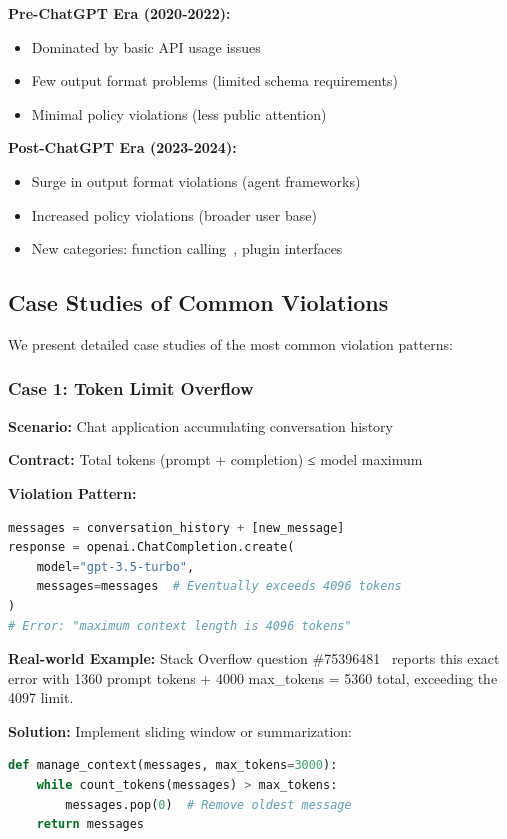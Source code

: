 \documentclass[11pt]{article}
\begin{document}
\textbf{Pre-ChatGPT Era (2020-2022):}
\begin{itemize}
    \item Dominated by basic API usage issues
    \item Few output format problems (limited schema requirements)
    \item Minimal policy violations (less public attention)
\end{itemize}

\textbf{Post-ChatGPT Era (2023-2024):}
\begin{itemize}
    \item Surge in output format violations (agent frameworks)~\cite{githublangchain22103}
    \item Increased policy violations (broader user base)~\cite{githubopenai331}
    \item New categories: function calling~\cite{githubopenai703}, plugin interfaces
\end{itemize}

\subsection{Case Studies of Common Violations}

We present detailed case studies of the most common violation patterns:

\subsubsection{Case 1: Token Limit Overflow}
\textbf{Scenario:} Chat application accumulating conversation history

\textbf{Contract:} Total tokens (prompt + completion) ≤ model maximum

\textbf{Violation Pattern:}
\begin{lstlisting}[language=Python]
messages = conversation_history + [new_message]
response = openai.ChatCompletion.create(
    model="gpt-3.5-turbo",
    messages=messages  # Eventually exceeds 4096 tokens
)
# Error: "maximum context length is 4096 tokens"
\end{lstlisting}

\textbf{Real-world Example:} Stack Overflow question \#75396481~\cite{stackoverflow75396481} reports this exact error with 1360 prompt tokens + 4000 max\_tokens = 5360 total, exceeding the 4097 limit.

\textbf{Solution:} Implement sliding window or summarization:
\begin{lstlisting}[language=Python]
def manage_context(messages, max_tokens=3000):
    while count_tokens(messages) > max_tokens:
        messages.pop(0)  # Remove oldest message
    return messages
\end{lstlisting}
\end{document}
